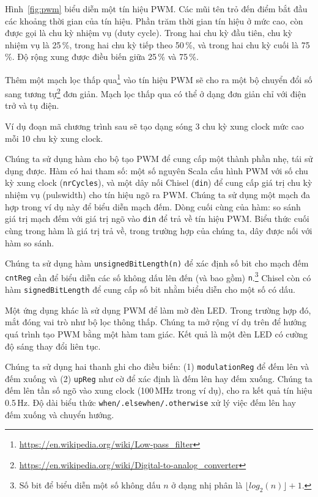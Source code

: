 \documentclass[%
    10pt,
    headinclude, footexclude,
    openright, %
    notitlepage,
    cleardoubleempty,
    headsepline,
    pointlessnumbers,
    bibtotoc, idxtotoc,
    ]{scrbook}
\newcommand{\code}[1]{{\small{\texttt{#1}}}}
\newcommand{\myref}[2]{\href{#1}{#2}}
\renewcommand{\myref}[2]{{#2}{\footnote{\url{#1}}}}
\begin{document}
Hình~\ref{fig:pwm} biểu diễn một tín hiệu PWM. Các mũi tên trỏ đến điểm bắt đầu các 
khoảng thời gian của tín hiệu. Phần trăm thời gian tín hiệu ở mức cao, còn được gọi là 
chu kỳ nhiệm vụ (duty cycle). Trong hai chu kỳ đầu tiên, chu kỳ nhiệm vụ là 25\,\%, 
trong hai chu kỳ tiếp theo 50\,\%, và trong hai chu kỳ cuối là 75\,\%. Độ rộng xung được 
điều biến giữa 25\,\% và 75\,\%.

Thêm một \myref{https://en.wikipedia.org/wiki/Low-pass_filter}{mạch lọc thấp qua} vào tín hiệu PWM
sẽ cho ra một 
\myref{https://en.wikipedia.org/wiki/Digital-to-analog_converter}{bộ chuyển đổi số sang tương tự} đơn giản.
Mạch lọc thấp qua có thể ở dạng đơn giản chỉ với điện trở và tụ điện.

Ví dụ đoạn mã chương trình sau sẽ tạo dạng sóng 3 chu kỳ xung clock mức cao mỗi 10 chu kỳ xung clock.


\noindent Chúng ta sử dụng hàm cho bộ tạo PWM để cung cấp một thành phần nhẹ, tái sử dụng được.
Hàm có hai tham số: một số nguyên Scala cấu hình PWM với số chu kỳ xung clock (\code{nrCycles}), 
và một dây nối Chisel (\code{din}) để cung cấp giá trị chu kỳ nhiệm vụ (pulswidth) cho 
tín hiệu ngõ ra PWM. Chúng ta sử dụng một mạch đa hợp trong ví dụ này để biểu diễn mạch đếm.
Dòng cuối cùng của hàm: so sánh giá trị mạch đếm với giá trị ngõ vào \code{din} để trả về tín hiệu PWM. 
Biểu thức cuối cùng trong hàm là giá trị trả về, trong trường hợp của chúng ta, dây được nối với hàm so sánh.

Chúng ta sử dụng hàm \code{unsignedBitLength(n)} để xác định số bit cho mạch đếm
\code{cntReg} cần để biểu diễn các số không dấu lên đến (và bao gồm)
\code{n}.\footnote{Số bit để biểu diễn một số không dấu $n$ ở dạng nhị phân là $\lfloor log_2(n) \rfloor + 1$.}
Chisel còn có hàm \code{signedBitLength} để cung cấp số bit nhằm biểu diễn cho một số có dấu.


Một ứng dụng khác là sử dụng PWM để làm mờ đèn LED. Trong trường hợp đó, mắt đóng vai trò 
như bộ lọc thông thấp. Chúng ta mở rộng ví dụ trên để hướng quá trình tạo PWM bằng một hàm 
tam giác. Kết quả là một đèn LED có cường độ sáng thay đổi liên tục. 


Chúng ta sử dụng hai thanh ghi cho điều biến: (1) \code{modulationReg} để đếm lên và đếm xuống
và (2) \code{upReg} như cờ để xác định là đếm lên hay đếm xuống. Chúng ta đếm lên tần số
ngõ vào xung clock (100\,MHz trong ví dụ), cho ra kết quả tín hiệu
0.5\,Hz. Độ dài biểu thức \code{when/.elsewhen/.otherwise} xử lý việc đếm lên hay đếm xuống 
và chuyển hướng.
\end{document}
